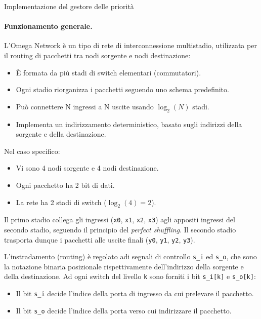 \begin{code}
    \inputminted{vhdl}{vhdl/omega_network_priority_manager.vhd}
    \caption{Implementazione del gestore delle priorità}
    \label{cod:omega_network_priority_manager}
\end{code}

\paragraph{Funzionamento generale.}
L’Omega Network è un tipo di rete di interconnessione multistadio, utilizzata per il routing di pacchetti tra nodi sorgente e nodi destinazione:

\begin{itemize}
    \item È formata da più stadi di switch elementari (commutatori).
    \item Ogni stadio riorganizza i pacchetti seguendo uno schema predefinito.
    \item Può connettere N ingressi a N uscite usando $\log_{2}(N)$ stadi.
    \item Implementa un indirizzamento deterministico, basato sugli indirizzi della sorgente e della destinazione.
\end{itemize}

Nel caso specifico:

\begin{itemize}
    \item Vi sono 4 nodi sorgente e 4 nodi destinazione.
    \item Ogni pacchetto ha 2 bit di dati.
    \item La rete ha 2 stadi di switch ($\log_{2}(4) = 2$).
\end{itemize}

Il primo stadio collega gli ingressi (\texttt{x0}, \texttt{x1}, \texttt{x2}, \texttt{x3}) agli appositi ingressi del secondo stadio, seguendo il principio del \textit{perfect shuffling}. Il secondo stadio trasporta dunque i pacchetti alle uscite finali (\texttt{y0}, \texttt{y1}, \texttt{y2}, \texttt{y3}).

L'instradamento (routing) è regolato adi segnali di controllo \texttt{s\_i} ed \texttt{s\_o}, che sono la notazione binaria posizionale rispettivamente dell'indirizzo della sorgente e della destinazione. Ad ogni switch del livello \texttt{k} sono forniti i bit \texttt{s\_i[k]} e \texttt{s\_o[k]}:

\begin{itemize}
    \item Il bit \texttt{s\_i} decide l'indice della porta di ingresso da cui prelevare il pacchetto.
    \item Il bit \texttt{s\_o} decide l'indice della porta verso cui indirizzare il pacchetto.
\end{itemize}

